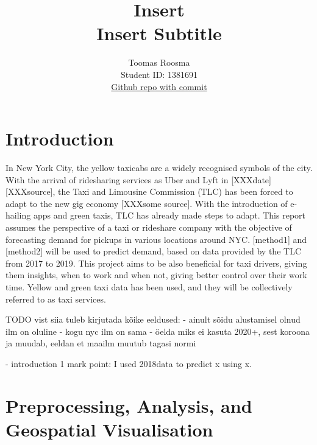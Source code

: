 \documentclass[11pt]{article}
\title{\textbf{Insert} \\ Insert Subtitle}
\author{
Toomas Roosma \\
Student ID: 1381691 \\
\href{https://github.com/MAST30034-Applied-Data-Science/mast30034\_p1\_template/tree/fd9f1dd17fdbcb5b119b70c93a22da8210d44fd7}{Github repo with commit}
}
\begin{document}
\maketitle

\section{Introduction}
In  New York City, the yellow taxicabs are a widely recognised symbols of the city. 
With the arrival of ridesharing services as Uber and Lyft in [XXXdate][XXXsource], the Taxi and Limousine Commission (TLC) has been forced to adapt to the new 
gig economy [XXXsome source]. With the introduction of e-hailing apps and green taxis, TLC has already made steps to adapt. This report
assumes the perspective of a taxi or rideshare company with the objective of forecasting demand for pickups in various locations around NYC.
[method1] and [method2] will be used to predict demand, based on data provided by the TLC from 2017 to 2019. This project aims to be also beneficial for taxi drivers, giving them insights, when to work and when not, giving better control over their work time. Yellow and green taxi data has been used, and they will be collectively referred to as taxi services.



TODO vist siia tuleb kirjutada kõike eeldused:
    - ainult sõidu alustamisel olnud ilm on oluline
    - kogu nyc ilm on sama
    - öelda miks ei kasuta 2020+, sest koroona ja muudab, eeldan et maailm muutub tagasi normi

    - introduction 1 mark point: I used 2018data to predict x using x. 




\section{Preprocessing, Analysis, and Geospatial Visualisation}
\end{document}
